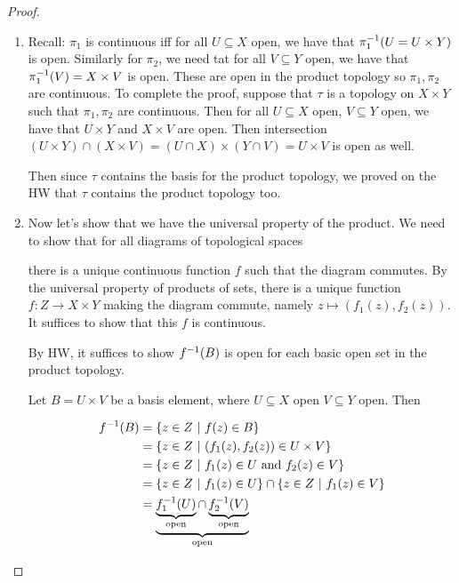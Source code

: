 \documentclass[12pt, twosided]{article}
\begin{document}
\begin{proof}
  \begin{enumerate}
  \item Recall: \(\pi_1\) is continuous iff for all \(U \subseteq X\) open, we have that \(\pi_1^{-1}(U = U \times Y)\) is open. Similarly for \(\pi_2\), we need tat for all \(V \subseteq Y\) open, we have that \(\pi_1^{-1}(V) = X \times V\) is open. These are open in the product topology so \(\pi_1, \pi_2\) are continuous. To complete the proof, suppose that \(\tau\) is a topology on \(X \times Y\) such that \(\pi_1, \pi_2\) are continuous.  Then for all \(U \subseteq X\) open, \(V \subseteq Y\) open, we have that \(U \times Y\) and \(X \times V\) are open. Then intersection \((U \times Y) \cap (X \times V) = (U \cap X) \times (Y \cap V) = U \times V\) is open as well.

    Then since \(\tau\) contains the basis for the product topology, we proved on the HW that \(\tau\) contains the product topology too.
  \item Now let's show that we have the universal property of the product. We need to show that for all diagrams of topological spaces
    \begin{center}
    \end{center}
    
  there is a unique continuous function \(f\) such that the diagram commutes. By the universal property of products of sets, there is a unique function \(f: Z \to X \times Y\) making the diagram commute, namely \(z \mapsto (f_1(z), f_2(z))\). It suffices to show that this \(f\) is continuous.

  By HW, it suffices to show \(f^{-1}(B)\) is open for each basic open set in the product topology.

  Let \(B = U \times V\) be a basis element, where \(U \subseteq X\) open \(V \subseteq Y\) open. Then

  \begin{align*}
    f^{-1}(B) &= \left\{ z \in Z \ \middle\vert\  f(z) \in B \right\} \\
           &= \left\{ z \in Z \ \middle\vert\  (f_1(z), f_2(z)) \in U \times V \right\} \\
           &= \left\{ z \in Z \ \middle\vert\  f_1(z) \in U\ \mathrm{and}\ f_2(z) \in V \right\} \\
           &= \left\{ z \in Z \ \middle\vert\  f_1(z) \in U \right\} \cap \left\{ z \in Z \ \middle\vert\  f_1(z) \in V \right\} \\
           &= \underbrace{\underbrace{f^{-1}_1(U)}_{\mathrm{open}} \cap \underbrace{f_2^{-1}(V)}_{\mathrm{open}}}_{\mathrm{open}}
  \end{align*}
\end{enumerate}
\end{proof}
\end{document}
